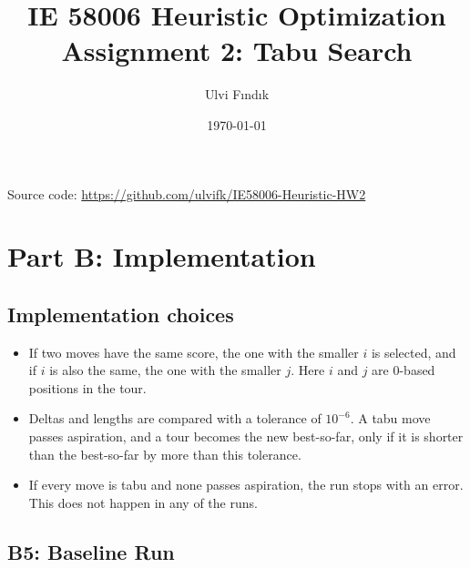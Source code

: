 \documentclass[11pt]{article}
\title{IE 58006 Heuristic Optimization\\Assignment 2: Tabu Search}
\author{Ulvi F\i nd\i k}
\date{\today}
\begin{document}
\maketitle

\begin{center}
Source code: \url{https://github.com/ulvifk/IE58006-Heuristic-HW2}
\end{center}



\section*{Part B: Implementation}

\subsection*{Implementation choices}

\begin{itemize}
    \item If two moves have the same score, the one with the smaller $i$ is selected, and if $i$ is also the same, the one with the smaller $j$. Here $i$ and $j$ are 0-based positions in the tour.
    \item Deltas and lengths are compared with a tolerance of $10^{-6}$. A tabu move passes aspiration, and a tour becomes the new best-so-far, only if it is shorter than the best-so-far by more than this tolerance.
    \item If every move is tabu and none passes aspiration, the run stops with an error. This does not happen in any of the runs.
\end{itemize}

\subsection*{B5: Baseline Run}

\begin{table}[H]
    \centering
    
    \caption{First 15 iterations of the baseline run ($d = 7$).}
    \label{tab:first-iterations}
\end{table}



\begin{table}[H]
    \centering
    
    \caption{Final best length, number of worsening moves selected and number of aspiration uses in the baseline run ($d = 7$, 100 iterations).}
    \label{tab:baseline-summary}
\end{table}
\end{document}
